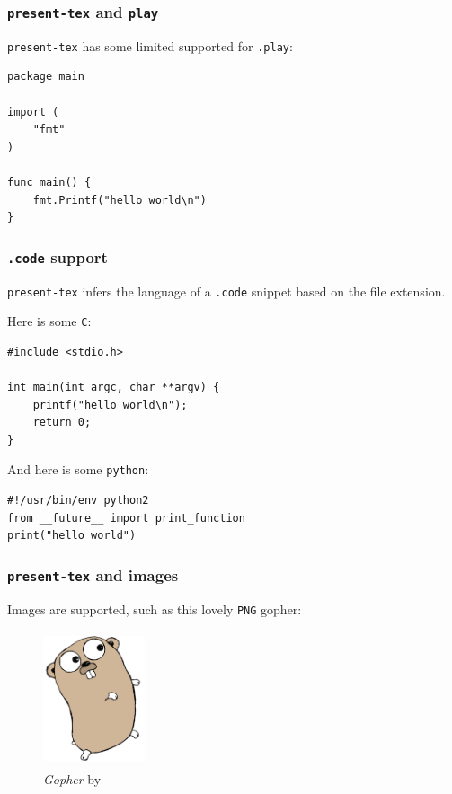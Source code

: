 \documentclass[9pt]{beamer}
\newcommand{\colhref}[3][blue]{\href{#2}{\color{#1}{#3}}}%
\begin{document}
\begin{frame}[fragile]
\frametitle{\texttt{present-tex} and \texttt{play}}

\texttt{present-tex} has some limited supported for \texttt{.play}:



\begin{verbatim}
package main

import (
	"fmt"
)

func main() {
	fmt.Printf("hello world\n")
}

\end{verbatim}

\end{frame}

\begin{frame}[fragile]
\frametitle{\texttt{.code} support}

\texttt{present-tex} infers the language of a \texttt{.code} snippet based on the file extension.

Here is some \texttt{C}:



\begin{verbatim}
#include <stdio.h>

int main(int argc, char **argv) {
	printf("hello world\n");
	return 0;
}

\end{verbatim}

And here is some \texttt{python}:



\begin{verbatim}
#!/usr/bin/env python2
from __future__ import print_function
print("hello world")

\end{verbatim}

\end{frame}

\begin{frame}[fragile]
\frametitle{\texttt{present-tex} and images}

Images are supported, such as this lovely \texttt{PNG} gopher:



\begin{figure}[h]
\begin{center}
\includegraphics[width=3cm,height=4cm]{_figs/gopher.png}
\end{center}
\caption{\emph{Gopher} by \colhref{http://www.reneefrench.com}{\texttt{Ren\'ee French}}}
\end{figure}

\end{frame}
\end{document}
